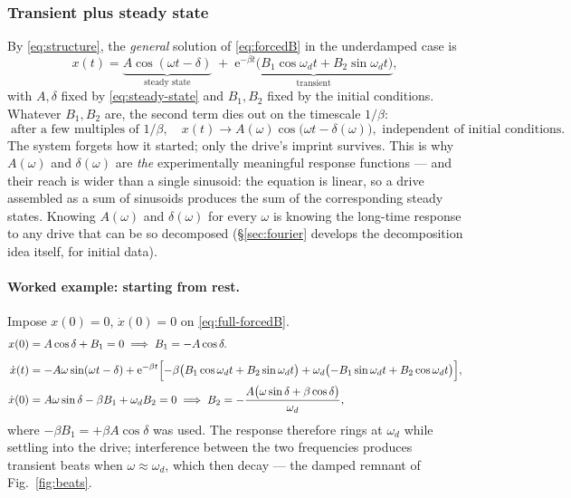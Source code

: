 \documentclass[11pt]{article}
\theoremstyle{plain}
\theoremstyle{definition}
\theoremstyle{remark}
\newcommand{\ee}{\mathrm{e}}
\begin{document}
\subsubsection{Transient plus steady state}
\label{sec:transients}

By \eqref{eq:structure}, the \emph{general} solution of \eqref{eq:forcedB} in
the underdamped case is
\begin{equation}
  x(t) =
  \underbrace{A\cos(\omega t - \delta)}_{\text{steady state}}
  \;+\;
  \underbrace{\ee^{-\beta t}\bigl(B_1\cos\omega_d t + B_2 \sin\omega_d t\bigr)}_{\text{transient}},
  \label{eq:full-forcedB}
\end{equation}
with $A,\delta$ fixed by \eqref{eq:steady-state} and $B_1,B_2$ fixed by the
initial conditions. Whatever $B_1,B_2$ are, the second term dies out on the
timescale $1/\beta$:
\begin{equation}
  \boxed{\;\text{after a few multiples of }1/\beta,\quad
  x(t) \to A(\omega)\cos\bigl(\omega t - \delta(\omega)\bigr),
  \text{ independent of initial conditions.}\;}
\end{equation}
The system forgets how it started; only the drive's imprint survives. This is
why $A(\omega)$ and $\delta(\omega)$ are \emph{the} experimentally meaningful
response functions --- and their reach is wider than a single sinusoid:
the equation is linear, so a drive assembled as a sum of sinusoids
produces the sum of the corresponding steady states. Knowing
$A(\omega)$ and $\delta(\omega)$ for every $\omega$ is knowing the
long-time response to any drive that can be so decomposed
(\S\ref{sec:fourier} develops the decomposition idea itself, for
initial data).

\paragraph{Worked example: starting from rest.}
Impose $x(0)=0$, $\dot x(0)=0$ on \eqref{eq:full-forcedB}.
\begin{align}
  x(0) &= A\cos\delta + B_1 = 0
  \;\Longrightarrow\;
  B_1 = -A\cos\delta .
  \\[4pt]
  \dot x(t) &= -A\omega\sin(\omega t - \delta)
   + \ee^{-\beta t}\Bigl[-\beta\bigl(B_1\cos\omega_d t + B_2\sin\omega_d t\bigr)
   + \omega_d\bigl(-B_1\sin\omega_d t + B_2\cos\omega_d t\bigr)\Bigr],
  \nonumber\\
  \dot x(0) &= A\omega\sin\delta - \beta B_1 + \omega_d B_2 = 0
  \;\Longrightarrow\;
  B_2 = -\frac{A\bigl(\omega\sin\delta + \beta\cos\delta\bigr)}{\omega_d},
\end{align}
where $-\beta B_1 = +\beta A\cos\delta$ was used. The response therefore
rings at $\omega_d$ while settling into the drive; interference between the
two frequencies produces transient beats when $\omega\approx\omega_d$, which
then decay --- the damped remnant of Fig.~\ref{fig:beats}.
\end{document}
